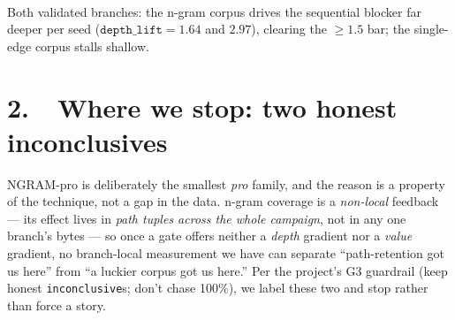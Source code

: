 \documentclass[11pt]{article}
\begin{document}
\begin{center}
\\[-1pt]
{\footnotesize Both validated branches: the n-gram corpus drives the sequential
blocker far deeper per seed ($\texttt{depth\_lift}=1.64$ and $2.97$), clearing the
$\ge1.5$ bar; the single-edge corpus stalls shallow.}
\end{center}

\section*{2.\ \ Where we stop: two honest inconclusives}
NGRAM-pro is deliberately the smallest \emph{pro} family, and the reason is a
property of the technique, not a gap in the data. n-gram coverage is a
\emph{non-local} feedback --- its effect lives in \emph{path tuples across the
whole campaign}, not in any one branch's bytes --- so once a gate offers neither a
\emph{depth} gradient nor a \emph{value} gradient, no branch-local measurement we
have can separate ``path-retention got us here'' from ``a luckier corpus got us
here.'' Per the project's G3 guardrail (keep honest \texttt{inconclusive}s; don't
chase 100\%), we label these two and stop rather than force a story.
\end{document}
